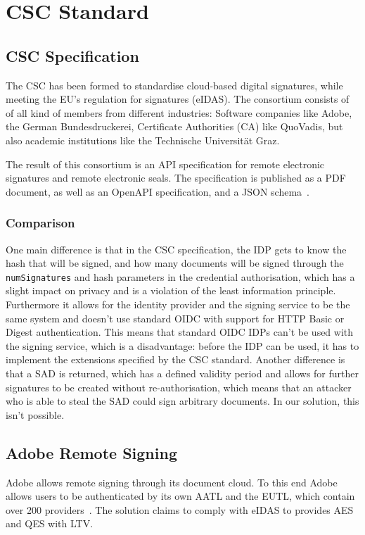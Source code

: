 \chapter{CSC Standard}\label{ch:cscstandard}

\section{CSC Specification}\label{sec:csc-specification}

The \acrfull{CSC} has been formed to standardise cloud-based digital signatures, while meeting the \gls{EU}'s regulation for signatures (\gls{eIDAS}).
The consortium consists of of all kind of members from different industries: Software companies like Adobe,
the German Bundesdruckerei, Certificate Authorities (\gls{CA}) like QuoVadis,
but also academic institutions like the Technische Universit\"at Graz.

The result of this consortium is an \gls{API} specification for remote electronic signatures and remote electronic seals.
The specification is published as a \gls{PDF} document, as well as an \gls{OpenAPI} specification, and a \gls{JSON} schema~\cite{csc-spec}.

\subsection{Comparison}\label{subsec:comparison}
One main difference is that in the \gls{CSC} specification,
the \gls{IDP} gets to know the hash that will be signed,
and how many documents will be signed through the \texttt{numSignatures} and hash parameters in the credential authorisation,
which has a slight impact on privacy and is a violation of the least information principle.
Furthermore it allows for the identity provider and the signing service to be the same system and doesn't use standard \gls{OIDC} with support for \gls{HTTP} Basic or Digest authentication.
This means that standard \gls{OIDC} \gls{IDP}s can't be used with the signing service, which is a disadvantage:
before the \gls{IDP} can be used, it has to implement the extensions specified by the \gls{CSC} standard.
Another difference is that a \gls{SAD} is returned, which has a defined validity period and allows for further signatures to be created without re-authorisation,
which means that an attacker who is able to steal the \gls{SAD} could sign arbitrary documents.
In our solution, this isn't possible.

\section{Adobe Remote Signing}\label{sec:adobe-remote-signing}
Adobe allows remote signing through its document cloud.
To this end Adobe allows users to be authenticated by its own \gls{AATL} and the \gls{EUTL}, which contain over 200 providers~\cite{adobe-cloud-sign}.
The solution claims to comply with \gls{eIDAS} to provides \gls{AES} and \gls{QES} with \gls{LTV}.
